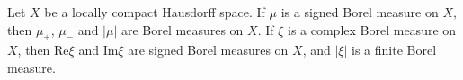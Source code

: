 Let $X$ be a locally compact Hausdorff space. If $\mu$ is a signed Borel measure on $X$, then $\mu_+$, $\mu_-$ and $|\mu|$ are Borel measures on $X$. If $\xi$ is a complex Borel measure on $X$, then $\text{Re} \xi$ and $\text{Im} \xi$ are signed Borel measures on $X$, and $|\xi|$ is a finite Borel measure.

